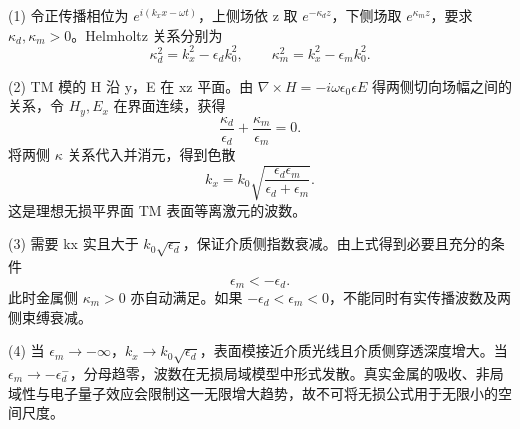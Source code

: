 (1) 令正传播相位为 \(e^{i(k_xx-\omega t)}\)，上侧场依 z 取 \(e^{-\kappa_dz}\)，下侧场取 \(e^{\kappa_mz}\)，要求 \(\kappa_d,\kappa_m>0\)。Helmholtz 关系分别为
\[
\kappa_d^2=k_x^2-\epsilon_dk_0^2,\qquad
\kappa_m^2=k_x^2-\epsilon_mk_0^2.
\]

(2) TM 模的 H 沿 y，E 在 xz 平面。由 \(\nabla\times H=-i\omega\epsilon_0\epsilon E\) 得两侧切向场幅之间的关系，令 \(H_y,E_x\) 在界面连续，获得
\[
\frac{\kappa_d}{\epsilon_d}+\frac{\kappa_m}{\epsilon_m}=0.
\]
将两侧 \(\kappa \) 关系代入并消元，得到色散
\[
k_x=k_0\sqrt{\frac{\epsilon_d\epsilon_m}{\epsilon_d+\epsilon_m}}.
\]
这是理想无损平界面 TM 表面等离激元的波数。

(3) 需要 kx 实且大于 \(k_0\sqrt{\epsilon_d}\)，保证介质侧指数衰减。由上式得到必要且充分的条件
\[
\epsilon_m<-\epsilon_d.
\]
此时金属侧 \(\kappa_m>0\) 亦自动满足。如果 \(-\epsilon_d<\epsilon_m<0\)，不能同时有实传播波数及两侧束缚衰减。

(4) 当 \(\epsilon_m\to-\infty\)，\(k_x\to k_0\sqrt{\epsilon_d}\)，表面模接近介质光线且介质侧穿透深度增大。当 \(\epsilon_m\to-\epsilon_d^-\)，分母趋零，波数在无损局域模型中形式发散。真实金属的吸收、非局域性与电子量子效应会限制这一无限增大趋势，故不可将无损公式用于无限小的空间尺度。
